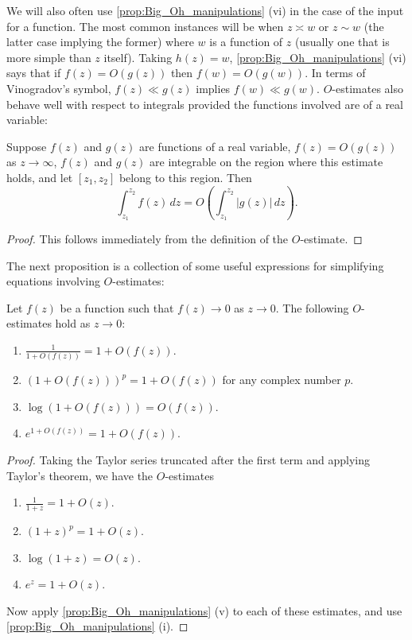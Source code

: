         We will also often use \cref{prop:Big_Oh_manipulations} (vi) in the case of the input for a function. The most common instances will be when $z \asymp w$ or $z \sim w$ (the latter case implying the former) where $w$ is a function of $z$ (usually one that is more simple than $z$ itself). Taking $h(z) = w$, \cref{prop:Big_Oh_manipulations} (vi) says that if $f(z) = O(g(z))$ then $f(w) = O(g(w))$. In terms of Vinogradov's symbol, $f(z) \ll g(z)$ implies $f(w) \ll g(w)$. $O$-estimates also behave well with respect to integrals provided the functions involved are of a real variable:

        \begin{proposition}
          Suppose $f(z)$ and $g(z)$ are functions of a real variable, $f(z) = O(g(z))$ as $z \to \infty$, $f(z)$ and $g(z)$ are integrable on the region where this estimate holds, and let $[z_{1},z_{2}]$ belong to this region. Then
          \[
            \int_{z_{1}}^{z_{2}}f(z)\,dz = O\left(\int_{z_{1}}^{z_{2}}|g(z)|\,dz\right).
          \]
        \end{proposition}
        \begin{proof}
          This follows immediately from the definition of the $O$-estimate.
        \end{proof}

        The next proposition is a collection of some useful expressions for simplifying equations involving $O$-estimates:

        \begin{proposition}
          Let $f(z)$ be a function such that $f(z) \to 0$ as $z \to 0$. The following $O$-estimates hold as $z \to 0$:
          \begin{enumerate}[label=(\roman*)]
            \item $\frac{1}{1+O(f(z))} = 1+O(f(z))$.
            \item $(1+O(f(z)))^{p} = 1+O(f(z))$ for any complex number $p$.
            \item $\log(1+O(f(z))) = O(f(z))$.
            \item $e^{1+O(f(z))} = 1+O(f(z))$.
          \end{enumerate}
        \end{proposition}
        \begin{proof}
          Taking the Taylor series truncated after the first term and applying Taylor's theorem, we have the $O$-estimates
          \begin{enumerate}[label=(\roman*)]
            \item $\frac{1}{1+z} = 1+O(z)$.
            \item $(1+z)^{p} = 1+O(z)$.
            \item $\log(1+z) = O(z)$.
            \item $e^{z} = 1+O(z)$.
          \end{enumerate}
          Now apply \cref{prop:Big_Oh_manipulations} (v) to each of these estimates, and use \cref{prop:Big_Oh_manipulations} (i).
        \end{proof}

